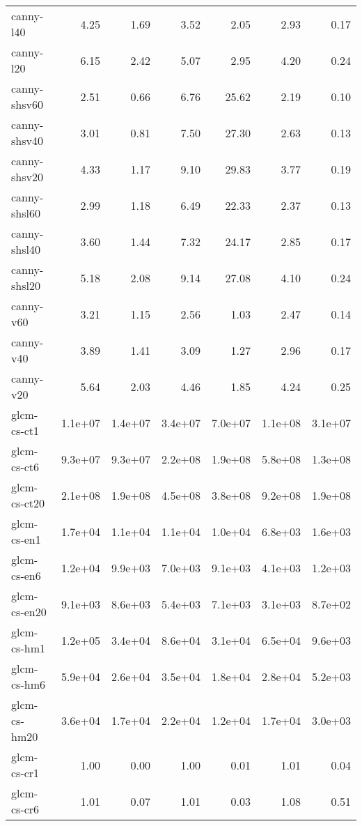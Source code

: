 \begin{tabular}{lrrrrrr}
canny-l40           &    4.25 &    1.69 &    3.52 &    2.05 &    2.93 &    0.17 \\
canny-l20           &    6.15 &    2.42 &    5.07 &    2.95 &    4.20 &    0.24 \\
canny-shsv60        &    2.51 &    0.66 &    6.76 &   25.62 &    2.19 &    0.10 \\
canny-shsv40        &    3.01 &    0.81 &    7.50 &   27.30 &    2.63 &    0.13 \\
canny-shsv20        &    4.33 &    1.17 &    9.10 &   29.83 &    3.77 &    0.19 \\
canny-shsl60        &    2.99 &    1.18 &    6.49 &   22.33 &    2.37 &    0.13 \\
canny-shsl40        &    3.60 &    1.44 &    7.32 &   24.17 &    2.85 &    0.17 \\
canny-shsl20        &    5.18 &    2.08 &    9.14 &   27.08 &    4.10 &    0.24 \\
canny-v60           &    3.21 &    1.15 &    2.56 &    1.03 &    2.47 &    0.14 \\
canny-v40           &    3.89 &    1.41 &    3.09 &    1.27 &    2.96 &    0.17 \\
canny-v20           &    5.64 &    2.03 &    4.46 &    1.85 &    4.24 &    0.25 \\
glcm-cs-ct1         & 1.1e+07 & 1.4e+07 & 3.4e+07 & 7.0e+07 & 1.1e+08 & 3.1e+07 \\
glcm-cs-ct6         & 9.3e+07 & 9.3e+07 & 2.2e+08 & 1.9e+08 & 5.8e+08 & 1.3e+08 \\
glcm-cs-ct20        & 2.1e+08 & 1.9e+08 & 4.5e+08 & 3.8e+08 & 9.2e+08 & 1.9e+08 \\
glcm-cs-en1         & 1.7e+04 & 1.1e+04 & 1.1e+04 & 1.0e+04 & 6.8e+03 & 1.6e+03 \\
glcm-cs-en6         & 1.2e+04 & 9.9e+03 & 7.0e+03 & 9.1e+03 & 4.1e+03 & 1.2e+03 \\
glcm-cs-en20        & 9.1e+03 & 8.6e+03 & 5.4e+03 & 7.1e+03 & 3.1e+03 & 8.7e+02 \\
glcm-cs-hm1         & 1.2e+05 & 3.4e+04 & 8.6e+04 & 3.1e+04 & 6.5e+04 & 9.6e+03 \\
glcm-cs-hm6         & 5.9e+04 & 2.6e+04 & 3.5e+04 & 1.8e+04 & 2.8e+04 & 5.2e+03 \\
glcm-cs-hm20        & 3.6e+04 & 1.7e+04 & 2.2e+04 & 1.2e+04 & 1.7e+04 & 3.0e+03 \\
glcm-cs-cr1         &    1.00 &    0.00 &    1.00 &    0.01 &    1.01 &    0.04 \\
glcm-cs-cr6         &    1.01 &    0.07 &    1.01 &    0.03 &    1.08 &    0.51 \\

\end{tabular}
